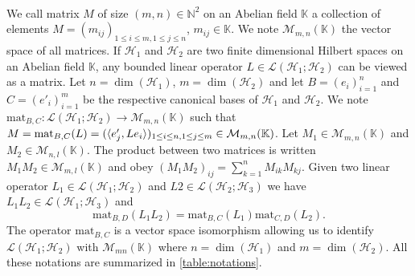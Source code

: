 \paragraph{}
We call matrix $M$ of size $(m,n)\in\mathbb{N}^2$ on an Abelian field $\mathbb{K}$ a collection of elements $M=(m_{ij})_{1\le i\le m, 1\le j \le n}$, $m_{ij}\in\mathbb{K}$. We note $\mathcal{M}_{m,n}(\mathbb{K})$ the vector space of all matrices. If $\mathcal{H}_1$ and $\mathcal{H}_2$ are two finite dimensional Hilbert spaces on an Abelian field $\mathbb{K}$, any bounded linear operator $L\in\mathcal{L}(\mathcal{H}_1;\mathcal{H}_2)$ can be viewed as a matrix. Let $n=\dim(\mathcal{H}_1)$, $m=\dim(\mathcal{H}_2)$ and let $B=(e_i)_{i=1}^{n}$ and $C=(e'_i)_{i=1}^{m}$ be the respective canonical bases of $\mathcal{H}_1$ and $\mathcal{H}_2$. We note $\text{mat}_{B, C}: \mathcal{L}(\mathcal{H}_1;\mathcal{H}_2) \to \mathcal{M}_{m,n}(\mathbb{K})$ such that $M=\text{mat}_{B, C}(L)=(\langle e'_j, L e_i\rangle)_{1\le i\le n, 1\le j \le m}\in\mathcal{M}_{m,n}(\mathbb{K})$. Let $M_1\in\mathcal{M}_{m,n}(\mathbb{K})$ and $M_2\in\mathcal{M}_{n,l}(\mathbb{K})$. The product between two matrices is written $M_1M_2\in\mathcal{M}_{m,l}(\mathbb{K})$ and obey $(M_1M_2)_{ij} = \sum_{k=1}^n M_{ik}M_{kj}$. Given two linear operator $L_1\in\mathcal{L}(\mathcal{H}_1;\mathcal{H}_2)$ and $L2\in\mathcal{L}(\mathcal{H}_2;\mathcal{H}_3)$ we have $L_1L_2\in\mathcal{L}(\mathcal{H}_1;\mathcal{H}_3)$ and \begin{dmath*}
\text{mat}_{B, D}(L_1L_2)=\text{mat}_{B, C}(L_1)\text{mat}_{C, D}(L_2).
\end{dmath*}
The operator $\text{mat}_{B, C}$ is a vector space isomorphism allowing us to identify $\mathcal{L}(\mathcal{H}_1;\mathcal{H}_2)$ with $\mathcal{M}_{mn}(\mathbb{K})$ where $n=\dim(\mathcal{H}_1)$ and $m=\dim(\mathcal{H}_2)$. All these notations are summarized in \cref{table:notations}.



